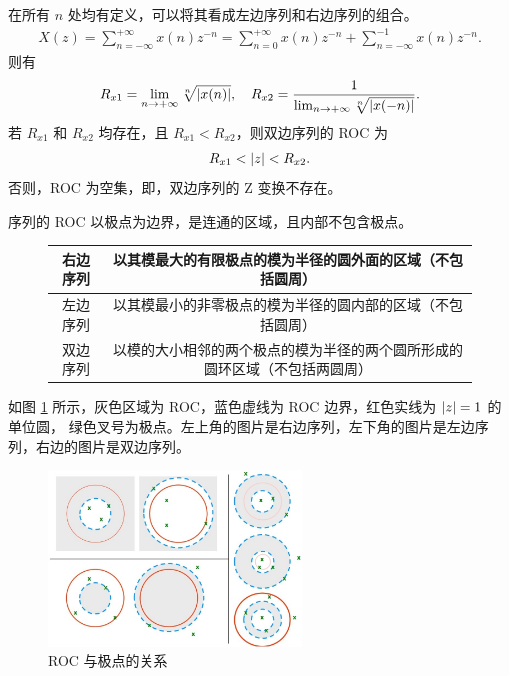 \begin{property}
    在所有 $n$ 处均有定义，可以将其看成左边序列和右边序列的组合。
    \begin{align*}
        X(z) = \sum_{n=-\infty}^{+\infty} x(n) z^{-n} = \sum_{n=0}^{+\infty} x(n) z^{-n} + \sum_{n=-\infty}^{-1} x(n) z^{-n}.
    \end{align*}
    则有
    \begin{align*}
        R_{x1} = \lim_{n \to +\infty}\sqrt[n]{\left|x(n)\right|}, \quad R_{x2} = \frac{1}{\lim_{n \to +\infty}\sqrt[n]{\left|x(-n)\right|}}.
    \end{align*}
    若 $R_{x1}$ 和 $R_{x2}$ 均存在，且 $R_{x1} < R_{x2}$，则双边序列的 ROC 为
    \begin{align*}
        R_{x1} < \left|z\right| < R_{x2}.
    \end{align*}
    否则，ROC 为空集，即，双边序列的 Z 变换不存在。
\end{property}

\begin{remark}
    序列的 ROC 以极点为边界，是连通的区域，且内部不包含极点。
    \begin{figure}[H]
        \centering
        \begin{tabular}{|c||c|}
            \hline
            右边序列 & 以其模最大的有限极点的模为半径的圆外面的区域（不包括圆周） \\
            \hline
            左边序列 & 以其模最小的非零极点的模为半径的圆内部的区域（不包括圆周） \\
            \hline
            双边序列 & 以模的大小相邻的两个极点的模为半径的两个圆所形成的圆环区域（不包括两圆周） \\
            \hline
        \end{tabular}
    \end{figure}
    如图 \ref{fig:roc_pole} 所示，灰色区域为 ROC，蓝色虚线为 ROC 边界，红色实线为 $\left|z\right| = 1$ 的单位圆，
    绿色叉号为极点。左上角的图片是右边序列，左下角的图片是左边序列，右边的图片是双边序列。
    \begin{figure}[H]
        \centering
        \includegraphics[width=0.6\textwidth]{chap4/img/roc_pole.png}
        \caption{ROC 与极点的关系}
        \label{fig:roc_pole}
    \end{figure}
\end{remark}

